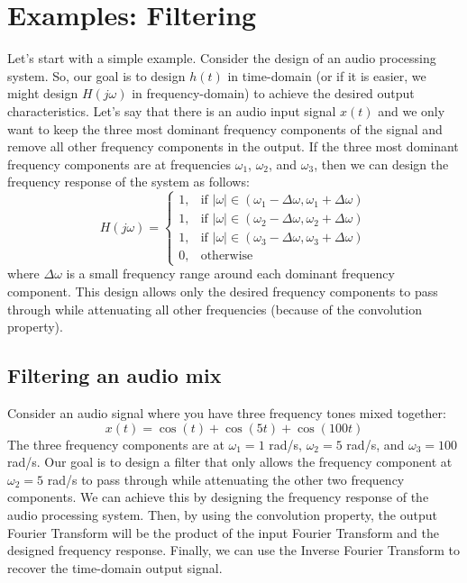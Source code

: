 \section{Examples: Filtering}
Let's start with a simple example. Consider the design of an audio processing system. So, our goal is to design $h(t)$ in time-domain (or if it is easier, we might design $H(j\omega)$ in frequency-domain) to achieve the desired output characteristics. Let's say that there is an audio input signal $x(t)$ and we only want to keep the three most dominant frequency components of the signal and remove all other frequency components in the output. If the three most dominant frequency components are at frequencies $\omega_1$, $\omega_2$, and $\omega_3$, then we can design the frequency response of the system as follows:
\[
H(j\omega) = \begin{cases}
    1, & \text{if } |\omega| \in (\omega_1 - \Delta \omega, \omega_1 + \Delta \omega) \\
    1, & \text{if } |\omega| \in (\omega_2 - \Delta \omega, \omega_2 + \Delta \omega) \\
    1, & \text{if } |\omega| \in (\omega_3 - \Delta \omega, \omega_3 + \Delta \omega) \\
    0, & \text{otherwise}
\end{cases}
\]
where \( \Delta \omega \) is a small frequency range around each dominant frequency component. This design allows only the desired frequency components to pass through while attenuating all other frequencies (because of the convolution property). 
\subsection{Filtering an audio mix}
Consider an audio signal where you have three frequency tones mixed together:
\[
x(t) = \cos(t) + \cos(5t) + \cos(100t)
\]
The three frequency components are at \( \omega_1 = 1 \) rad/s, \( \omega_2 = 5 \) rad/s, and \( \omega_3 = 100 \) rad/s. Our goal is to design a filter that only allows the frequency component at \( \omega_2 = 5 \) rad/s to pass through while attenuating the other two frequency components. We can achieve this by designing the frequency response of the audio processing system. Then, by using the convolution property, the output Fourier Transform will be the product of the input Fourier Transform and the designed frequency response. Finally, we can use the Inverse Fourier Transform to recover the time-domain output signal.


